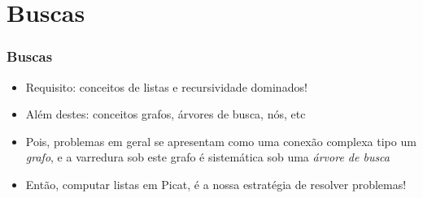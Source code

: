 \section{Buscas}
\begin{frame}

    \frametitle{Buscas}

   \begin{block}{}
     \begin{itemize}
      \item Requisito: conceitos de listas e recursividade  dominados!
       \pause
      \item Além destes: conceitos grafos, árvores de busca, nós, etc
         
       \pause
      \item Pois, problemas em geral
      se apresentam como uma conexão complexa tipo um \textit{grafo},
      e a varredura sob este grafo é sistemática
      sob uma \textit{árvore de busca}
      \pause
      
     \item Então, computar listas em Picat, é a nossa estratégia
     de resolver problemas!

    \end{itemize}
    
    \end{block}
    
\end{frame}



